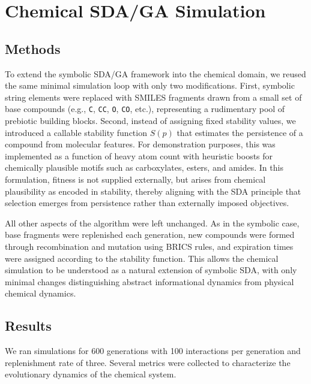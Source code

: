 \documentclass[life,article,submit,pdftex,moreauthors]{Definitions/mdpi}
\begin{document}
\section{Chemical SDA/GA Simulation}

\subsection{Methods}

To extend the symbolic SDA/GA framework into the chemical domain, we reused the same minimal simulation loop with only two modifications. First, symbolic string elements were replaced with SMILES fragments drawn from a small set of base compounds (e.g., \texttt{C}, \texttt{CC}, \texttt{O}, \texttt{CO}, etc.), representing a rudimentary pool of prebiotic building blocks. Second, instead of assigning fixed stability values, we introduced a callable stability function $S(p)$ that estimates the persistence of a compound from molecular features. For demonstration purposes, this was implemented as a function of heavy atom count with heuristic boosts for chemically plausible motifs such as carboxylates, esters, and amides. In this formulation, fitness is not supplied externally, but arises from chemical plausibility as encoded in stability, thereby aligning with the SDA principle that selection emerges from persistence rather than externally imposed objectives.  

All other aspects of the algorithm were left unchanged. As in the symbolic case, base fragments were replenished each generation, new compounds were formed through recombination and mutation using BRICS rules, and expiration times were assigned according to the stability function. This allows the chemical simulation to be understood as a natural extension of symbolic SDA, with only minimal changes distinguishing abstract informational dynamics from physical chemical dynamics.  

\subsection{Results}

We ran simulations for 600 generations with 100 interactions per generation and replenishment rate of three. Several metrics were collected to characterize the evolutionary dynamics of the chemical system.  
\end{document}
